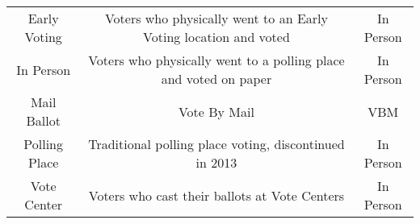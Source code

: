 \documentclass[12pt,twoside]{reedthesis}
\begin{document}
\begin{longtable}[]{@{}ccc@{}}
\begin{minipage}[t]{0.13\columnwidth}
  Early Voting\strut
  \end{minipage} & \begin{minipage}[t]{0.62\columnwidth}\centering\strut
  Voters who physically went to an Early Voting location and voted\strut
  \end{minipage} & \begin{minipage}[t]{0.16\columnwidth}\centering\strut
  In Person\strut
  \end{minipage}\tabularnewline
  \begin{minipage}[t]{0.13\columnwidth}\centering\strut
  In Person\strut
  \end{minipage} & \begin{minipage}[t]{0.62\columnwidth}\centering\strut
  Voters who physically went to a polling place and voted on paper\strut
  \end{minipage} & \begin{minipage}[t]{0.16\columnwidth}\centering\strut
  In Person\strut
  \end{minipage}\tabularnewline
  \begin{minipage}[t]{0.13\columnwidth}\centering\strut
  Mail Ballot\strut
  \end{minipage} & \begin{minipage}[t]{0.62\columnwidth}\centering\strut
  Vote By Mail\strut
  \end{minipage} & \begin{minipage}[t]{0.16\columnwidth}\centering\strut
  VBM\strut
  \end{minipage}\tabularnewline
  \begin{minipage}[t]{0.13\columnwidth}\centering\strut
  Polling Place\strut
  \end{minipage} & \begin{minipage}[t]{0.62\columnwidth}\centering\strut
  Traditional polling place voting, discontinued in 2013\strut
  \end{minipage} & \begin{minipage}[t]{0.16\columnwidth}\centering\strut
  In Person\strut
  \end{minipage}\tabularnewline
  \begin{minipage}[t]{0.13\columnwidth}\centering\strut
  Vote Center\strut
  \end{minipage} & \begin{minipage}[t]{0.62\columnwidth}\centering\strut
  Voters who cast their ballots at Vote Centers\strut
  \end{minipage} & \begin{minipage}[t]{0.16\columnwidth}\centering\strut
  In Person\strut
  \end{minipage}\tabularnewline
  \bottomrule
  \end{longtable}
  
\end{document}
